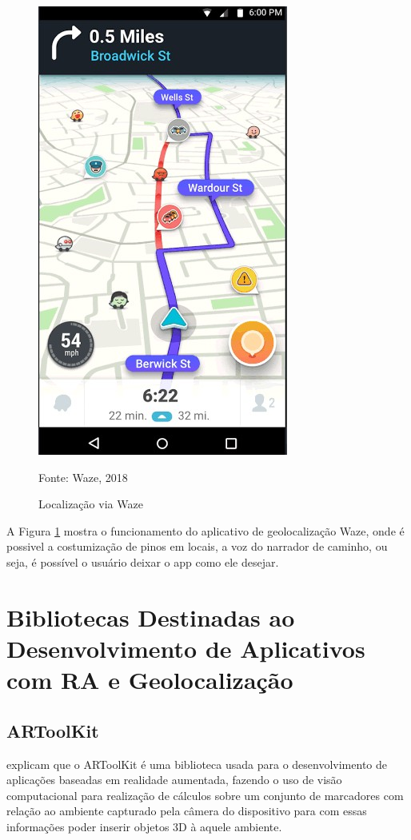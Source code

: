 	\begin{figure}[H]
		\centering
		\includegraphics[scale=0.4]{imagens/waze}
		\caption{Localização via Waze}
		Fonte: Waze, 2018
		\label{fig:waze}	
	\end{figure}

		A Figura \ref{fig:waze} mostra o funcionamento do aplicativo de geolocalização Waze, onde é possivel a costumização de pinos em locais, a voz do narrador de caminho, ou seja, é possível o usuário deixar o app como ele desejar.
	
\section{Bibliotecas Destinadas ao Desenvolvimento de Aplicativos com RA e Geolocalização}

	\subsection{ARToolKit}
		 explicam que o ARToolKit é uma biblioteca usada para o desenvolvimento de aplicações baseadas em realidade aumentada, fazendo o uso de visão computacional para realização de  cálculos sobre um conjunto de marcadores com relação ao ambiente capturado pela câmera do dispositivo para com essas informações poder inserir objetos 3D à aquele ambiente.
		
